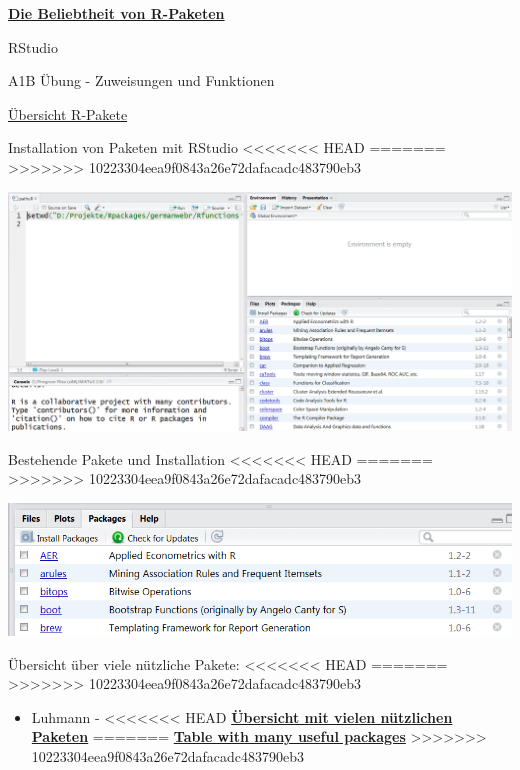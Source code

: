 \documentclass[ignorenonframetext,]{beamer}
\providecommand{\tightlist}{%
  \setlength{\itemsep}{0pt}\setlength{\parskip}{0pt}}
\begin{document}
\begin{frame}{\href{https://gallery.shinyapps.io/cran-gauge/}{\textbf{Die
Beliebtheit von R-Paketen}}}
\begin{frame}{RStudio}
\begin{frame}[fragile]{A1B Übung - Zuweisungen und Funktionen}
\begin{frame}{\href{https://www.youtube.com/watch?v=kKI9--Opmso}{Übersicht
R-Pakete}}
\begin{frame}{Installation von Paketen mit RStudio}
<<<<<<< HEAD
=======
\protect\hypertarget{installation-von-paketen-mit-rstudio}{}
>>>>>>> 10223304eea9f0843a26e72dafacadc483790eb3

\includegraphics{figure/PaketeRstudio.PNG}

\end{frame}

\begin{frame}{Bestehende Pakete und Installation}
<<<<<<< HEAD
=======
\protect\hypertarget{bestehende-pakete-und-installation}{}
>>>>>>> 10223304eea9f0843a26e72dafacadc483790eb3

\includegraphics{figure/packages3.PNG}

\end{frame}

\begin{frame}[fragile]{Übersicht über viele nützliche Pakete:}
<<<<<<< HEAD
=======
\protect\hypertarget{ubersicht-uber-viele-nutzliche-pakete}{}
>>>>>>> 10223304eea9f0843a26e72dafacadc483790eb3

\begin{itemize}
\tightlist
\item
  Luhmann -
<<<<<<< HEAD
  \href{http://www.beltz.de/fileadmin/beltz/downloads/OnlinematerialienPVU/28090_Luhmann/Verwendete\%20Pakete.pdf}{\textbf{Übersicht
  mit vielen nützlichen Paketen}}
=======
  \href{http://www.beltz.de/fileadmin/beltz/downloads/OnlinematerialienPVU/28090_Luhmann/Verwendete\%20Pakete.pdf}{\textbf{Table
  with many useful packages}}
>>>>>>> 10223304eea9f0843a26e72dafacadc483790eb3
\end{itemize}


\end{frame}
\end{frame}
\end{frame}
\end{frame}
\end{frame}
\end{document}

